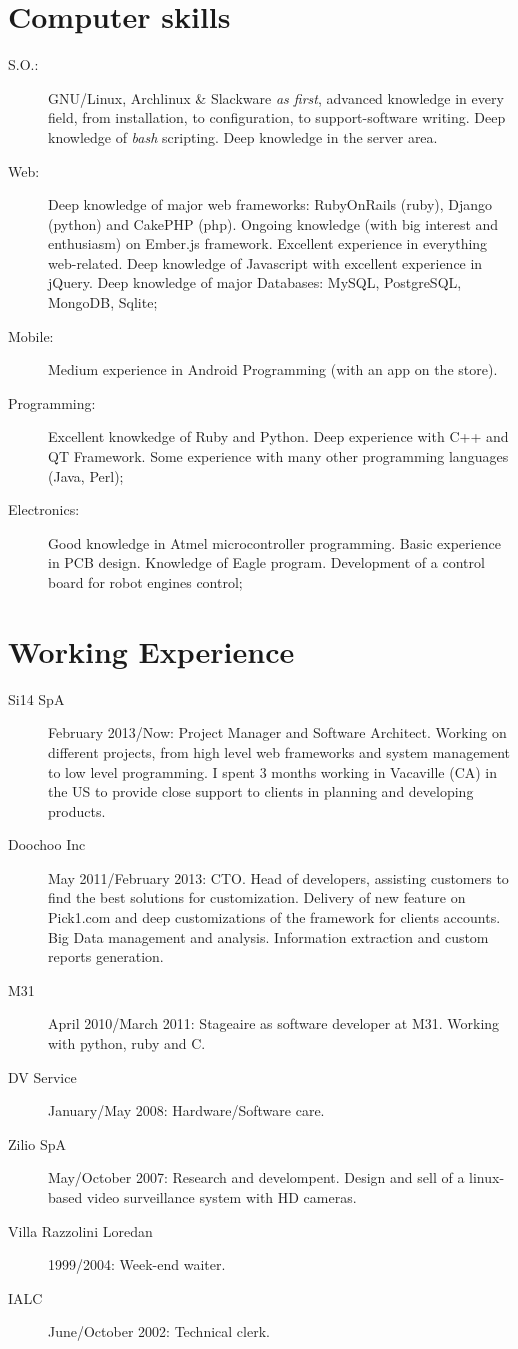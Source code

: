 \documentclass[pdftex, a4paper, 11pt]{article}
\begin{document}
\section*{Computer skills}
\begin{description}
\item[S.O.:] GNU/Linux, Archlinux \& Slackware {\em as first}, advanced knowledge
  in every field, from installation, to configuration, to support-software
  writing. Deep knowledge of {\em bash} scripting.
  Deep knowledge in the server area.
\item[Web:] Deep knowledge of major web frameworks: RubyOnRails (ruby),
  Django (python) and CakePHP (php).
  Ongoing knowledge (with big interest and enthusiasm) on Ember.js framework.
  Excellent experience in everything web-related.
  Deep knowledge of Javascript with excellent experience in jQuery.
  Deep knowledge of major Databases: MySQL, PostgreSQL, MongoDB, Sqlite;
\item[Mobile:] Medium experience in Android Programming (with an app on the store).
\item[Programming:] Excellent knowkedge of Ruby and Python. Deep experience with C++ and QT Framework. Some experience with many other programming
  languages (Java, Perl);
\item[Electronics:] Good knowledge in Atmel microcontroller programming. Basic experience
  in PCB design. Knowledge of Eagle program. Development of a control board for robot
  engines control;
\end{description}

\section*{Working Experience}
\begin{description}
\item[Si14 SpA] February 2013/Now: Project Manager and Software Architect.
    Working on different projects, from high level web frameworks and system management
    to low level programming. I spent 3 months working in Vacaville (CA) in the US
    to provide close support to clients in planning and developing products.
\item[Doochoo Inc] May 2011/February 2013: CTO. Head of developers, assisting
  customers to find the best solutions for customization.
  Delivery of new feature on Pick1.com and deep customizations of the framework
  for clients accounts. Big Data management and analysis. Information extraction and
  custom reports generation.
\item[M31] April 2010/March 2011: Stageaire as software developer at M31. Working with python, ruby and C.
\item[DV Service] January/May 2008: Hardware/Software care.
\item[Zilio SpA] May/October 2007: Research and develompent. Design and
  sell of a linux-based video surveillance system with HD cameras.
\item[Villa Razzolini Loredan] 1999/2004: Week-end waiter.
\item[IALC] June/October 2002: Technical clerk.
\end{description}
\end{document}

